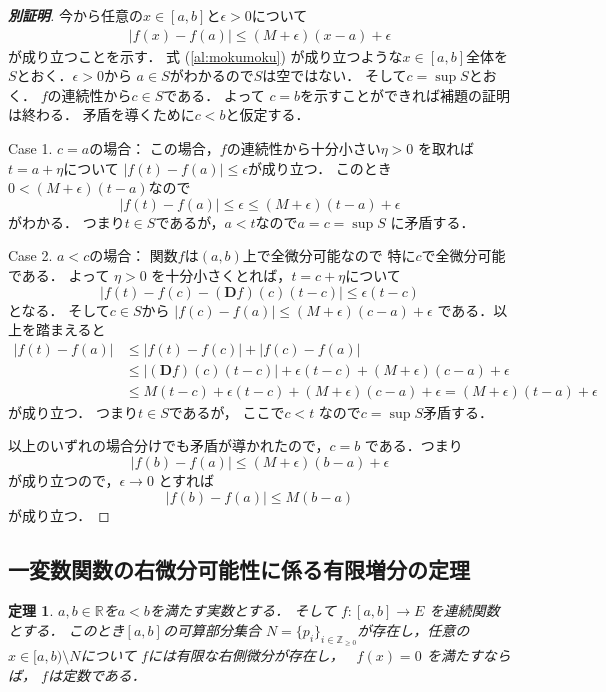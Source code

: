 \documentclass[leqno, a4paper, 12pt]{jsarticle}
\newtheorem{thm}{定理}
\newcommand{\zz}{\mathbb{Z}}
\newcommand{\rr}{\mathbb{R}}
\DeclareMathOperator{\dini}{D_{+}}
\newcommand{\ddd}{\mathbf{D}}
\begin{document}
\begin{proof}[\textbf{別証明}]
今から任意の$x\in [a, b]$と$\epsilon>0$について
\begin{align}\label{al:mokumoku}
|f(x)-f(a)|\le (M+\epsilon)(x-a)+\epsilon
\end{align}
が成り立つことを示す．
式 (\ref{al:mokumoku})
が成り立つような$x\in [a, b]$全体を
$S$とおく．$\epsilon>0$から
$a\in S$がわかるので$S$は空ではない．
そして$c=\sup S$とおく．
$f$の連続性から$c\in S$である．
よって
$c=b$を示すことができれば補題の証明は終わる．
矛盾を導くために$c<b$と仮定する．

Case 1. $c=a$の場合：
この場合，$f$の連続性から十分小さい$\eta>0$
を取れば$t=a+\eta$について
$|f(t)-f(a)|\le \epsilon$が成り立つ．
このとき$0<(M+\epsilon)(t-a)$なので
\[
|f(t)-f(a)|\le \epsilon
\le (M+\epsilon)(t-a)+\epsilon
\]
がわかる．
つまり$t\in S$であるが，$a<t$なので$a=c=\sup S$
に矛盾する．

Case 2. $a<c$の場合：
関数$f$は$(a, b)$上で全微分可能なので
特に$c$で全微分可能である．
よって
$\eta>0$
を十分小さくとれば，$t=c+\eta$について
\[
|f(t)-f(c)-(\ddd f)(c)(t-c)|\le \epsilon (t-c)
\]
となる．
そして$c\in S$から
$|f(c)-f(a)|\le (M+\epsilon)(c-a)+\epsilon$
である．以上を踏まえると
\begin{align*}
|f(t)-f(a)|&\le 
|f(t)-f(c)|+|f(c)-f(a)|
\\
&\le |(\ddd f)(c)(t-c)|+\epsilon(t-c)+
 (M+\epsilon)(c-a)+\epsilon
\\
& \le M(t-c)+\epsilon(t-c)+
 (M+\epsilon)(c-a)+\epsilon
 =(M+\epsilon)(t-a)+\epsilon
\end{align*}
が成り立つ．
つまり$t\in S$であるが，
ここで$c<t$
なので$c=\sup S$矛盾する．

以上のいずれの場合分けでも矛盾が導かれたので，$c=b$
である．つまり
\[
|f(b)-f(a)|\le (M+\epsilon)(b-a)+\epsilon
\]
が成り立つので，$\epsilon\to 0$
とすれば
\[
|f(b)-f(a)|\le M(b-a)
\]
が成り立つ．
\end{proof}


\subsection{一変数関数の右微分可能性に係る有限増分の定理}
\begin{thm}
$a, b\in \rr$を$a<b$を満たす実数とする．
そして
$f: [a, b]\to E$
を連続関数とする．
このとき$[a, b]$の可算部分集合
$N=\{p_{i}\}_{i\in \zz_{\ge 0}}$が存在し，任意の$x\in [a, b)\setminus N$について
$f$には有限な右側微分が存在し，
$\dini f(x)=0$
を満たすならば，
$f$は定数である．
\end{thm}
\end{document}
